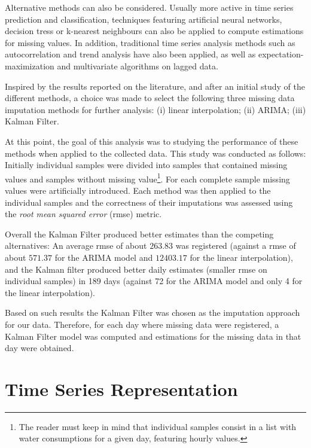 \documentclass[9pt,journal,compsoc]{IEEEtran}
\begin{document}
Alternative methods can also be considered. Usually more active in time series prediction and classification, techniques featuring artificial neural networks, decision tress or k-nearest neighbours\cite{troyanskaya2001missing, yu2014short} can also be applied to compute estimations for missing values. In addition, traditional time series analysis methods such as autocorrelation and trend analysis have also been applied\cite{abreu2012using}, as well as expectation-maximization and multivariate algorithms on lagged data\cite{moritz2015comparison}.

Inspired by the results reported on the literature, and after an initial study of the different methods, a choice was made to select the following three missing data imputation methods for further analysis: (i) linear interpolation; (ii) ARIMA; (iii) Kalman Filter.

At this point, the goal of this analysis was to studying the performance of these methods when applied to the collected data. This study was conducted as follows: Initially individual samples were divided into samples that contained missing values and samples without missing value\footnote{The reader must keep in mind that individual samples consist in a list with water consumptions for a given day, featuring hourly values.}. For each complete sample missing values were artificially introduced. Each method was then applied to the individual samples and the correctness of their imputations was assessed using the \emph{root mean squared error} (rmse) metric.

Overall the Kalman Filter produced better estimates than the competing alternatives: An average rmse of about $263.83$ was registered (against a rmse of about $571.37$ for the ARIMA model and $12403.17$ for the linear interpolation), and the Kalman filter produced better daily estimates (smaller rmse on individual samples) in 189 days (against 72 for the ARIMA model and only 4 for the linear interpolation).

Based on such results the Kalman Filter was chosen as the imputation approach for our data. Therefore, for each day where missing data were registered, a Kalman Filter model was computed and estimations for the missing data in that day were obtained.

\section{Time Series Representation}
\label{time_series_representation}
\end{document}
